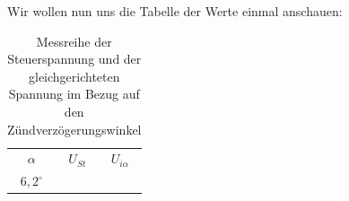 \documentclass{article}
\begin{document}
Wir wollen nun uns die Tabelle der Werte einmal anschauen:

\begin{table}[h]
  \centering
  \begin{tabular}{|c|c|c|}
    $\alpha$ & $U_{St}$ & $U_{i\alpha}$ \\
    $6,2^{\circ}$ & & \\
  \end{tabular}
  \caption{Messreihe der Steuerspannung und der gleichgerichteten Spannung im Bezug auf den Zündverzögerungswinkel}
  \label{tab:mess1}
\end{table}
\end{document}
